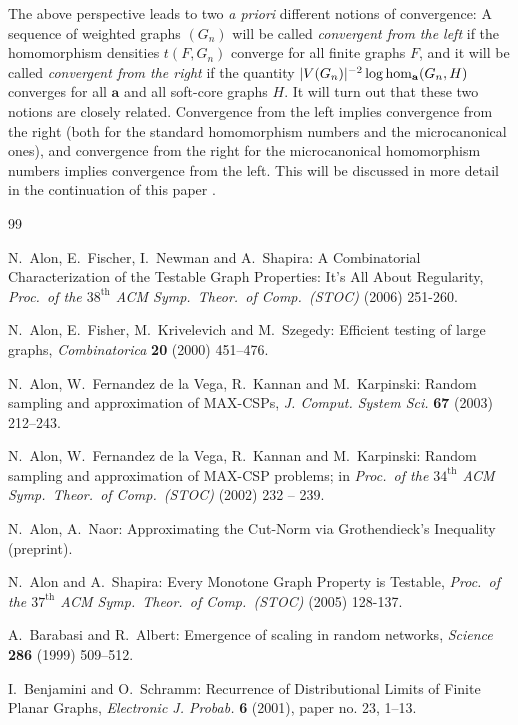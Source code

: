 \documentclass[12pt]{article}
\numberwithin{equation}{section}
\def\hom{{\rm hom}}
\def\ba{{\mathbf a}}
\begin{document}
The above perspective leads to two {\it a priori} different notions
of convergence: A sequence of weighted graphs $(G_n)$ will be called
{\it convergent from the left} if the homomorphism densities
$t(F,G_n)$ converge for all finite graphs $F$, and it will be called
{\it convergent from the right} if the quantity
$|V(G_n)|^{-2}\log\hom_{\ba}(G_n,H)$ converges {for all $\ba$ and}
all soft-core graphs $H$. It will turn out that these two notions
are closely related. Convergence from the left implies convergence
from the right (both for the standard homomorphism numbers and the
microcanonical ones), and convergence from the right for the
microcanonical homomorphism numbers implies convergence from the
left.  This will be discussed in more detail in the continuation of
this paper \cite{dense2}.

\begin{thebibliography}{99}

N.~Alon, E.~Fischer, I.~Newman and A.~Shapira: A Combinatorial
Characterization of the Testable Graph Properties: It's All About
Regularity, {\it Proc.\ of the $\text{38}^\text{th}$ ACM Symp.\
Theor.\ of Comp.\ (STOC)} (2006) 251-260.

N.~Alon, E.~Fisher, M.~Krivelevich and M.~Szegedy: Efficient testing
of large graphs, {\it Combinatorica} {\bf 20} (2000) 451--476.

N.~Alon, W.~Fernandez de la Vega, R.~Kannan and M.~Karpinski: Random
sampling and approximation of MAX-CSPs, {\it J. Comput. System Sci.}
{\bf 67} (2003) 212--243.

N.~Alon, W.~Fernandez de la Vega, R.~Kannan and M.~Karpinski: Random
sampling and approximation of MAX-CSP problems; in
{\it Proc.\ of the $\text{34}^\text{th}$ ACM Symp.\ Theor.\ of Comp.\
(STOC)} (2002) 232 -- 239.

N.~Alon, A.~Naor: Approximating the Cut-Norm via Grothendieck's
Inequality (preprint).

N.~Alon and A.~Shapira:
Every Monotone Graph Property is Testable,
{\it Proc.\ of the $\text{37}^\text{th}$ ACM Symp.\ Theor.\ of Comp.\
(STOC)} (2005) 128-137.

\bibitem{BA}
A.~Barabasi and R.~Albert: Emergence of scaling in random networks,
{\it Science} {\bf 286} (1999) 509--512.

\bibitem{BS}
I.~Benjamini and O.~Schramm: Recurrence of Distributional Limits of
Finite Planar Graphs, {\it Electronic J. Probab.} {\bf 6} (2001),
paper no. 23, 1--13.



\end{thebibliography}
\end{document}
